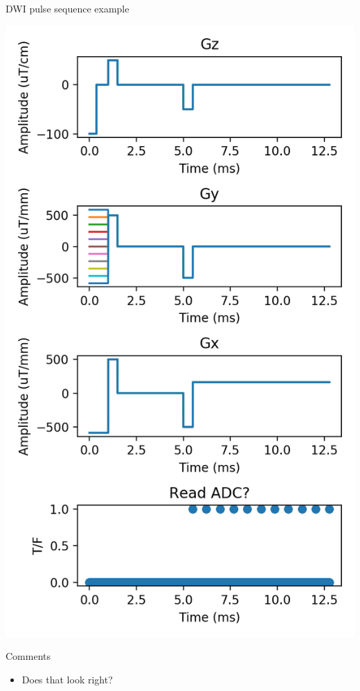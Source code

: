 \documentclass[dvipsnames]{beamer}
\begin{document}
\begin{frame}{DWI pulse sequence example}
\begin{center}
\includegraphics[height=0.8\textheight]{dwi_pulse_sequence.png}
\end{center}
\end{frame}

\begin{frame}{Comments}
\begin{itemize}
\item Does that look right?
\end{itemize}
\end{frame}
\end{document}

